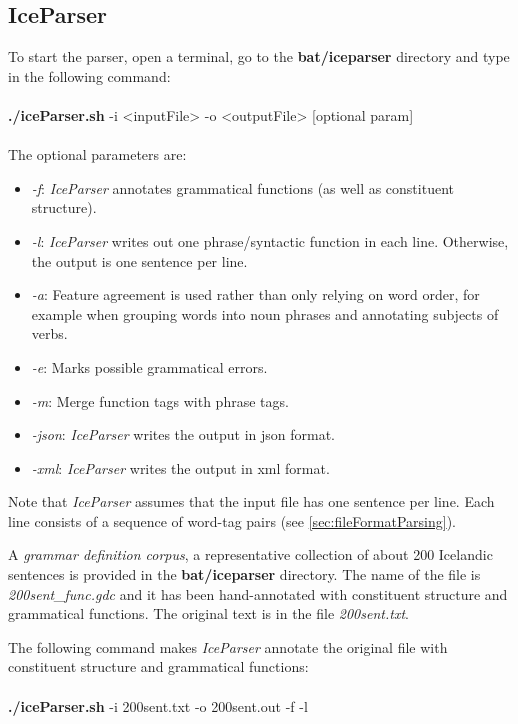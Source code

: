 \documentclass[11pt]{article}
\begin{document}
\subsection{IceParser}
To start the parser, open a terminal, go to the \textbf{bat/iceparser} directory and type in the following command:\\ \\
{\bf ./iceParser.sh} -i <inputFile> -o <outputFile> [optional param] \\ \\
The optional parameters are:
\begin{itemize}
\item \emph{-f}: \emph{IceParser} annotates grammatical functions (as well as constituent structure).
\item \emph{-l}: \emph{IceParser} writes out one phrase/syntactic function in each line. Otherwise, the output is one sentence per line.
\item \emph{-a}: Feature agreement is used rather than only relying on word order, for example when grouping words into noun phrases and annotating subjects of verbs.
\item \emph{-e}: Marks possible grammatical errors. 
\item \emph{-m}: Merge function tags with phrase tags.
\item \emph{-json}: \emph{IceParser} writes the output in json format.
\item \emph{-xml}: \emph{IceParser} writes the output in xml format.
\end{itemize}

Note that \emph{IceParser} assumes that the input file has one sentence per line.
Each line consists of a sequence of word-tag pairs (see \ref{sec:fileFormatParsing}).

A \emph{grammar definition corpus}, a representative collection of about 200 Icelandic sentences \citep{lof06c} is provided in the \textbf{bat/iceparser} directory.
The name of the file is \emph{200sent\_func.gdc} and it has been hand-annotated with constituent structure and grammatical functions.
The original text is in the file \emph{200sent.txt}.

The following command makes \emph{IceParser} annotate the original file with constituent structure and grammatical functions: \\ \\
{\bf ./iceParser.sh} -i 200sent.txt -o 200sent.out -f -l \\
\end{document}
